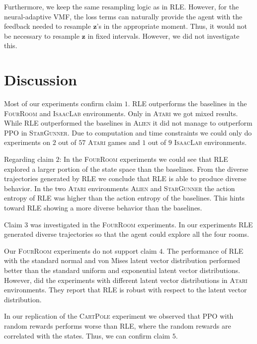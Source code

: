 \documentclass[10pt]{article} %
\begin{document}
Furthermore, we keep the same resampling logic as in \textsc{RLE}. However, for the neural-adaptive VMF, the loss terms can naturally provide the agent with the feedback needed to resample $\textbf{z}$'s in the appropriate moment. Thus, it would not be necessary to resample $\textbf{z}$ in fixed intervals. However, we did not investigate this.

\vspace{-6pt}
\hypertarget{sec5}{\section{Discussion}}
\vspace{-6pt}
Most of our experiments confirm claim $1$. \textsc{RLE} outperforms the baselines in the \textsc{FourRoom} and \textsc{IsaacLab} environments. Only in \textsc{Atari} we got mixed results. While \textsc{RLE} outperformed the baselines in \textsc{Alien} it did not manage to outperform \textsc{PPO} in \textsc{StarGunner}. Due to computation and time constraints we could only do experiments on $2$ out of $57$ \textsc{Atari} games and $1$ out of $9$ \textsc{IsaacLab} environments. 

Regarding claim $2$: In the \textsc{FourRoom} experiments we could see that \textsc{RLE} explored a larger portion of the state space than the baselines. From the diverse trajectories generated by \textsc{RLE} we conclude that \textsc{RLE} is able to produce diverse behavior. In the two \textsc{Atari} environments \textsc{Alien} and \textsc{StarGunner} the action entropy of \textsc{RLE} was higher than the action entropy of the baselines. This hints toward \textsc{RLE} showing a more diverse behavior than the baselines. 

Claim $3$ was investigated in the \textsc{FourRoom} experiments. In our experiments \textsc{RLE} generated diverse trajectories so that the agent could explore all the four rooms.

Our \textsc{FourRoom} experiments do not support claim $4$. The performance of \textsc{RLE} with the standard normal and von Mises latent vector distribution performed better than the standard uniform and exponential latent vector distributions. However, \cite{rle-paper} did the experiments with different latent vector distributions in \textsc{Atari} environments. They report that \textsc{RLE} is robust with respect to the latent vector distribution.

In our replication of the \textsc{CartPole} experiment we observed that PPO with random rewards performs worse than \textsc{RLE}, where the random rewards are correlated with the states. Thus, we can confirm claim $5$.
\end{document}
